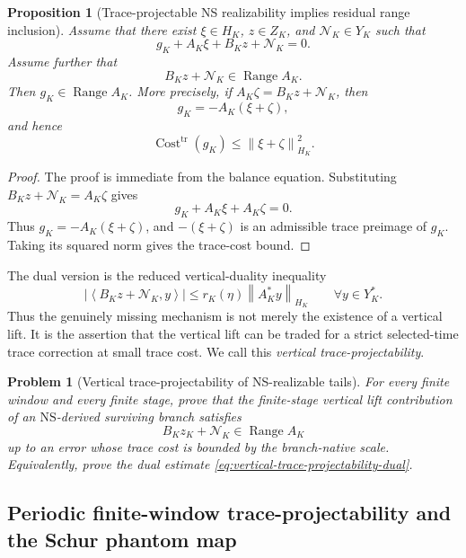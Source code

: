 \documentclass[11pt]{article}
\numberwithin{equation}{section}
\newtheorem{proposition}[theorem]{Proposition}
\newtheorem{problem}[theorem]{Problem}
\DeclareMathOperator{\Range}{Range}
\DeclareMathOperator{\Cost}{Cost}
\newcommand{\trc}{\mathrm{tr}}
\newcommand{\NS}{\mathrm{NS}}
\newcommand{\norm}[2]{\left\|#1\right\|_{#2}}
\newcommand{\ip}[2]{\left\langle #1,#2\right\rangle}
\begin{document}
\begin{proposition}[Trace-projectable NS realizability implies residual range inclusion]\label{prop:trace-projectable-realizability}
Assume that there exist \(\xi\in H_K\), \(z\in Z_K\), and \(\mathcal N_K\in Y_K\) such that
\[
        g_K+A_K\xi+B_Kz+\mathcal N_K=0.
\]
Assume further that
\[
        B_Kz+\mathcal N_K\in\Range A_K.
\]
Then \(g_K\in\Range A_K\).  More precisely, if \(A_K\zeta=B_Kz+\mathcal N_K\), then
\[
        g_K=-A_K(\xi+\zeta),
\]
and hence
\[
        \Cost^{\trc}(g_K)
        \le \norm{\xi+\zeta}{H_K}^2.
\]
\end{proposition}

\begin{proof}
The proof is immediate from the balance equation.  Substituting \(B_Kz+\mathcal N_K=A_K\zeta\) gives
\[
        g_K+A_K\xi+A_K\zeta=0.
\]
Thus \(g_K=-A_K(\xi+\zeta)\), and \(-(\xi+\zeta)\) is an admissible trace preimage of \(g_K\).  Taking its squared norm gives the trace-cost bound.
\end{proof}

The dual version is the reduced vertical-duality inequality
\begin{equation}\label{eq:vertical-trace-projectability-dual}
        |\ip{B_Kz+\mathcal N_K}{y}|
        \le r_K(\eta)\norm{A_K^*y}{H_K}
        \qquad \forall y\in Y_K^*.
\end{equation}
Thus the genuinely missing mechanism is not merely the existence of a vertical lift.  It is the assertion that the vertical lift can be traded for a strict selected-time trace correction at small trace cost.  We call this \emph{vertical trace-projectability}.

\begin{problem}[Vertical trace-projectability of NS-realizable tails]\label{prob:vertical-trace-projectability}
For every finite window and every finite stage, prove that the finite-stage vertical lift contribution of an \(\NS\)-derived surviving branch satisfies
\[
        B_Kz_K+\mathcal N_K\in\Range A_K
\]
up to an error whose trace cost is bounded by the branch-native scale.  Equivalently, prove the dual estimate \eqref{eq:vertical-trace-projectability-dual}.
\end{problem}

\subsection{Periodic finite-window trace-projectability and the Schur phantom map}\label{subsec:periodic-schur-map}
\end{document}
